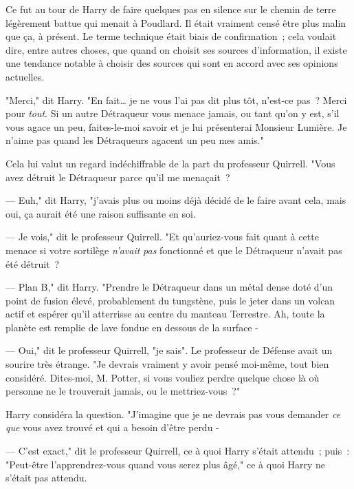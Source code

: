 Ce fut au tour de Harry de faire quelques pas en silence sur le chemin de terre légèrement battue qui menait à Poudlard. Il était vraiment censé être plus malin que ça, à présent. Le terme technique était biais de confirmation~; cela voulait dire, entre autres choses, que quand on choisit ses sources d'information, il existe une tendance notable à choisir des sources qui sont en accord avec ses opinions actuelles.

"Merci," dit Harry. "En fait… je ne vous l'ai pas dit plus tôt, n'est-ce pas~? Merci pour \emph{tout}. Si un autre Détraqueur vous menace jamais, ou tant qu'on y est, s'il vous agace un peu, faites-le-moi savoir et je lui présenterai Monsieur Lumière. Je n'aime pas quand les Détraqueurs agacent un peu mes amis."

Cela lui valut un regard indéchiffrable de la part du professeur Quirrell. "Vous avez détruit le Détraqueur parce qu'il me menaçait~?

--- Euh," dit Harry, "j'avais plus ou moins déjà décidé de le faire avant cela, mais oui, ça aurait été une raison suffisante en soi.

--- Je vois," dit le professeur Quirrell. "Et qu'auriez-vous fait quant à cette menace si votre sortilège \emph{n'avait} \emph{pas} fonctionné et que le Détraqueur n'avait pas été détruit~?

--- Plan B," dit Harry. "Prendre le Détraqueur dans un métal dense doté d'un point de fusion élevé, probablement du tungstène, puis le jeter dans un volcan actif et espérer qu'il atterrisse au centre du manteau Terrestre. Ah, toute la planète est remplie de lave fondue en dessous de la surface -

--- Oui," dit le professeur Quirrell, "je sais". Le professeur de Défense avait un sourire très étrange. "Je devrais vraiment y avoir pensé moi-même, tout bien considéré. Dites-moi, M. Potter, si vous vouliez perdre quelque chose là où personne ne le trouverait jamais, ou le mettriez-vous~?"

Harry considéra la question. "J'imagine que je ne devrais pas vous demander \emph{ce que} vous avez trouvé et qui a besoin d'être perdu -

--- C'est exact," dit le professeur Quirrell, ce à quoi Harry s'était attendu~; puis~: "Peut-être l'apprendrez-vous quand vous serez plus âgé," ce à quoi Harry ne s'était pas attendu.

